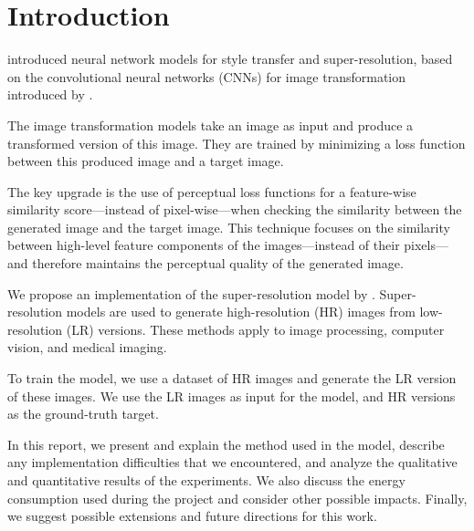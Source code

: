 \documentclass{article}
\begin{document}
{
    \section{Introduction}
    \label{sec:introduction}

    \cite{sr} introduced neural network models for style transfer and super-resolution, based on the convolutional neural networks (CNNs) for image transformation introduced by \cite{image-transform-network}.

    The image transformation models take an image as input and produce a transformed version of this image. They are trained by minimizing a loss function between this produced image and a target image.

    The key upgrade is the use of perceptual loss functions for a feature-wise similarity score---instead of pixel-wise---when checking the similarity between the generated image and the target image. This technique focuses on the similarity between high-level feature components of the images---instead of their pixels---and therefore maintains the perceptual quality of the generated image.

    \bigskip

    We propose an implementation of the super-resolution model by \cite{sr}. Super-resolution models are used to generate high-resolution (HR) images from low-resolution (LR) versions. These methods apply to image processing, computer vision, and medical imaging.

    To train the model, we use a dataset of HR images and generate the LR version of these images. We use the LR images as input for the model, and HR versions as the ground-truth target.

    \bigskip

    In this report, we present and explain the method used in the model, describe any implementation difficulties that we encountered, and analyze the qualitative and quantitative results of the experiments. We also discuss the energy consumption used during the project and consider other possible impacts. Finally, we suggest possible extensions and future directions for this work.
}
\end{document}
